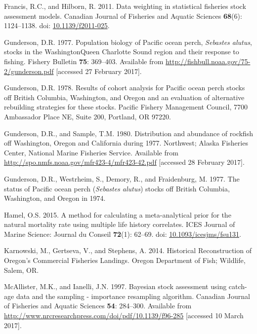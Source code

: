 \documentclass[12pt,]{article}
\begin{document}
\hypertarget{ref-francis_data_2011}{}
Francis, R.C., and Hilborn, R. 2011. Data weighting in statistical
fisheries stock assessment models. Canadian Journal of Fisheries and
Aquatic Sciences \textbf{68}(6): 1124--1138. doi:
\href{https://doi.org/10.1139/f2011-025}{10.1139/f2011-025}.

\hypertarget{ref-gunderson_population_1977}{}
Gunderson, D.R. 1977. Population biology of Pacific ocean perch,
\emph{Sebastes alutus}, stocks in the WashingtonQueen Charlotte Sound
region and their response to fishing. Fishery Bulletin \textbf{75}:
369--403. Available from
\url{http://fishbull.noaa.gov/75-2/gunderson.pdf} {[}accessed 27
February 2017{]}.

\hypertarget{ref-gunderson_results_1978}{}
Gunderson, D.R. 1978. Results of cohort analysis for Pacific ocean perch
stocks off British Columbia, Washington, and Oregon and an evaluation of
alternative rebuilding strategies for these stocks. Pacific Fishery
Management Council, 7700 Ambassador Place NE, Suite 200, Portland, OR
97220.

\hypertarget{ref-gunderson_distribution_1980}{}
Gunderson, D.R., and Sample, T.M. 1980. Distribution and abundance of
rockfish off Washington, Oregon and California during 1977. Northwest;
Alaska Fisheries Center, National Marine Fisheries Service. Available
from \url{http://spo.nmfs.noaa.gov/mfr423-4/mfr423-42.pdf} {[}accessed
28 February 2017{]}.

\hypertarget{ref-gunderson_status_1977}{}
Gunderson, D.R., Westrheim, S., Demory, R., and Fraidenburg, M. 1977.
The status of Pacific ocean perch (\emph{Sebastes alutus}) stocks off
British Columbia, Washington, and Oregon in 1974.

\hypertarget{ref-hamel_method_2015}{}
Hamel, O.S. 2015. A method for calculating a meta-analytical prior for
the natural mortality rate using multiple life history correlates. ICES
Journal of Marine Science: Journal du Conseil \textbf{72}(1): 62--69.
doi:
\href{https://doi.org/10.1093/icesjms/fsu131}{10.1093/icesjms/fsu131}.

\hypertarget{ref-karnowski_historical_2014}{}
Karnowski, M., Gertseva, V., and Stephens, A. 2014. Historical
Reconstruction of Oregon's Commercial Fisheries Landings. Oregon
Department of Fish; Wildlife, Salem, OR.

\hypertarget{ref-mcallister_bayesian_1997}{}
McAllister, M.K., and Ianelli, J.N. 1997. Bayesian stock assessment
using catch-age data and the sampling - importance resampling algorithm.
Canadian Journal of Fisheries and Aquatic Sciences \textbf{54}:
284--300. Available from
\url{http://www.nrcresearchpress.com/doi/pdf/10.1139/f96-285}
{[}accessed 10 March 2017{]}.
\end{document}
